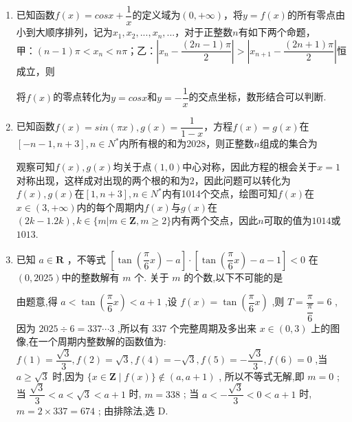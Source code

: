 \begin{enumerate}
\begin{enumerate}
\begin{jieda}
    \end{jieda}
    \item 已知函数$f(x) = cosx + \dfrac{1}{x}$的定义域为$(0, +\infty)$，将$y = f(x)$的所有零点由小到大顺序排列，记为$x_1, x_2, ..., x_n, ...$，对于正整数$n$有如下两个命题， \\
    甲：$(n-1)\pi < x_n < n\pi$；乙：$\left|x_n - \dfrac{(2n-1) \pi}{2}\right| > \left|x_{n+1} - \dfrac{(2n+1) \pi}{2}\right|$恒成立，则
    \begin{jieda}
        将$f(x)$的零点转化为$y = cosx$和$y = -\dfrac{1}{x}$的交点坐标，数形结合可以判断.
    \end{jieda}
    \item 已知函数$f(x) = sin\left(\pi x\right), g(x) = \dfrac{1}{1-x}$，方程$f(x) = g(x)$在$[-n-1, n+3], n \in N^{*}$内所有根的和为2028，则正整数$n$组成的集合为
    \begin{jieda}
        观察可知$f(x), g(x)$均关于点$(1, 0)$中心对称，因此方程的根会关于$x = 1$对称出现，这样成对出现的两个根的和为$2$，因此问题可以转化为$f(x), g(x)$在$[1, n+3], n \in N^{*}$内有1014个交点，绘图可知$f(x)$在$x \in (3, +\infty)$内的每个周期内$f(x)$与$g(x)$在$(2k-1. 2k), k \in \{m | m \in \mathbf{Z}, m \geq 2\}$内有两个交点，因此$n$可取的值为$1014$或$1013$.
    \end{jieda}
    \item 已知 $a \in  \mathbf{R}$ ，不等式 $\left\lbrack  {\tan \left( {\dfrac{\pi }{6}x}\right)  - a}\right\rbrack   \cdot  \left\lbrack  {\tan \left( {\dfrac{\pi }{6}x}\right)  - a - 1}\right\rbrack   < 0$ 在$(0,2025)$中的整数解有 $m$ 个. 关于 $m$ 的个数,以下不可能的是 
    \begin{jieda}
        由题意,得 $a < \tan \left( {\dfrac{\pi }{6}x}\right)  < a + 1$ ,设 $f\left( x\right)  =  \tan \left( {\dfrac{\pi }{6}x}\right)$ ,则 $T = \dfrac{\pi }{\dfrac{\pi }{6}} = 6$ ,因为 ${2025} \div  6 = {337}\cdots 3$ ,所以有 337 个完整周期及多出来 $x \in  \left( {0,3}\right)$ 上的图像,在一个周期内整数解的函数值为: $f\left( 1\right)  = \dfrac{\sqrt{3}}{3},f\left( 2\right)  = \sqrt{3},f\left( 4\right)  =  - \sqrt{3},f\left( 5\right)  =  - \dfrac{\sqrt{3}}{3},f\left( 6\right)  = 0$ ,当 $a \geq  \sqrt{3}$ 时,因为 $\{ x \in  \mathbf{Z} \mid  f\left( x\right) \}  \notin  \left( {a,a + 1}\right)$ , 所以不等式无解,即 $m = 0$ ; 当 $\dfrac{\sqrt{3}}{3} < a < \sqrt{3} < a + 1$ 时, $m = {338}$ ; 当 $a <  - \dfrac{\sqrt{3}}{3} < 0 < a + 1$ 时, $m = 2 \times  {337} = {674}$ ; 由排除法,选 D.


\end{jieda}
\end{enumerate}
\end{enumerate}
